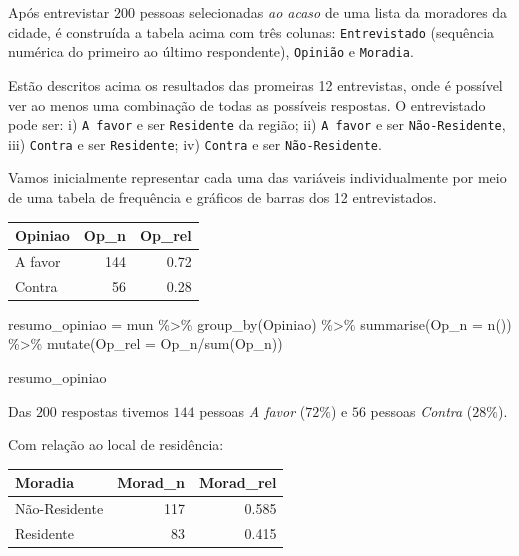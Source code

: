 \documentclass[
]{book}
\newenvironment{Shaded}{\begin{snugshade}}{\end{snugshade}}
\newcommand{\AttributeTok}[1]{\textcolor[rgb]{0.77,0.63,0.00}{#1}}
\newcommand{\FunctionTok}[1]{\textcolor[rgb]{0.00,0.00,0.00}{#1}}
\newcommand{\NormalTok}[1]{#1}
\newcommand{\OtherTok}[1]{\textcolor[rgb]{0.56,0.35,0.01}{#1}}
\newcommand{\SpecialCharTok}[1]{\textcolor[rgb]{0.00,0.00,0.00}{#1}}
\begin{document}
Após entrevistar \(200\) pessoas selecionadas \emph{ao acaso} de uma lista da moradores da cidade, é construída a tabela acima com três colunas: \texttt{Entrevistado} (sequência numérica do primeiro ao último respondente), \texttt{Opinião} e \texttt{Moradia}.

Estão descritos acima os resultados das promeiras 12 entrevistas, onde é possível ver ao menos uma combinação de todas as possíveis respostas. O entrevistado pode ser: i) \texttt{A\ favor} e ser \texttt{Residente} da região; ii) \texttt{A\ favor} e ser \texttt{Não-Residente}, iii) \texttt{Contra} e ser \texttt{Residente}; iv) \texttt{Contra} e ser \texttt{Não-Residente}.

Vamos inicialmente representar cada uma das variáveis individualmente por meio de uma tabela de frequência e gráficos de barras dos 12 entrevistados.

\begin{tabular}{l|r|r}
\hline
Opiniao & Op\_n & Op\_rel\\
\hline
A favor & 144 & 0.72\\
\hline
Contra & 56 & 0.28\\
\hline
\end{tabular}

\begin{Shaded}
\begin{Highlighting}[]
\NormalTok{resumo\_opiniao }\OtherTok{=}\NormalTok{ mun }\SpecialCharTok{\%\textgreater{}\%} 
  \FunctionTok{group\_by}\NormalTok{(Opiniao) }\SpecialCharTok{\%\textgreater{}\%} 
  \FunctionTok{summarise}\NormalTok{(}\AttributeTok{Op\_n =} \FunctionTok{n}\NormalTok{()) }\SpecialCharTok{\%\textgreater{}\%} 
  \FunctionTok{mutate}\NormalTok{(}\AttributeTok{Op\_rel =}\NormalTok{ Op\_n}\SpecialCharTok{/}\FunctionTok{sum}\NormalTok{(Op\_n))}

\NormalTok{resumo\_opiniao}
\end{Highlighting}
\end{Shaded}

Das \(200\) respostas tivemos \(144\) pessoas \emph{A favor} (\(72\%\)) e \(56\) pessoas \emph{Contra} (\(28\%\)).

Com relação ao local de residência:

\begin{tabular}{l|r|r}
\hline
Moradia & Morad\_n & Morad\_rel\\
\hline
Não-Residente & 117 & 0.585\\
\hline
Residente & 83 & 0.415\\
\hline
\end{tabular}
\end{document}
